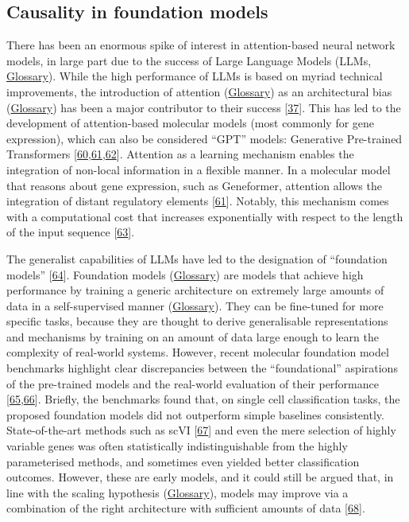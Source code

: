 \hypertarget{causality-in-foundation-models}{%
\subsection{Causality in foundation models}\label{causality-in-foundation-models}}

There has been an enormous spike of interest in attention-based neural network models, in large part due to the success of Large Language Models (LLMs, \protect\hyperlink{large-language-models}{Glossary}).
While the high performance of LLMs is based on myriad technical improvements, the introduction of attention (\protect\hyperlink{attention-deep-learning}{Glossary}) as an architectural bias (\protect\hyperlink{bias-machine-learning}{Glossary}) has been a major contributor to their success {[}\protect\hyperlink{ref-rh7nCPVE}{37}{]}.
This has led to the development of attention-based molecular models (most commonly for gene expression), which can also be considered ``GPT'' models: Generative Pre-trained Transformers {[}\protect\hyperlink{ref-gAQyFCbW}{60},\protect\hyperlink{ref-VmzWBJUJ}{61},\protect\hyperlink{ref-r5y0HbhJ}{62}{]}.
Attention as a learning mechanism enables the integration of non-local information in a flexible manner.
In a molecular model that reasons about gene expression, such as Geneformer, attention allows the integration of distant regulatory elements {[}\protect\hyperlink{ref-VmzWBJUJ}{61}{]}.
Notably, this mechanism comes with a computational cost that increases exponentially with respect to the length of the input sequence {[}\protect\hyperlink{ref-1DSO3BUly}{63}{]}.

The generalist capabilities of LLMs have led to the designation of ``foundation models'' {[}\protect\hyperlink{ref-U6LC2Ufe}{64}{]}.
Foundation models (\protect\hyperlink{foundation-model}{Glossary}) are models that achieve high performance by training a generic architecture on extremely large amounts of data in a self-supervised manner (\protect\hyperlink{self-supervised-learning}{Glossary}).
They can be fine-tuned for more specific tasks, because they are thought to derive generalisable representations and mechanisms by training on an amount of data large enough to learn the complexity of real-world systems.
However, recent molecular foundation model benchmarks highlight clear discrepancies between the ``foundational'' aspirations of the pre-trained models and the real-world evaluation of their performance {[}\protect\hyperlink{ref-WEYqVcYG}{65},\protect\hyperlink{ref-OFczH7ba}{66}{]}.
Briefly, the benchmarks found that, on single cell classification tasks, the proposed foundation models did not outperform simple baselines consistently.
State-of-the-art methods such as scVI {[}\protect\hyperlink{ref-1ELFXHA51}{67}{]} and even the mere selection of highly variable genes was often statistically indistinguishable from the highly parameterised methods, and sometimes even yielded better classification outcomes.
However, these are early models, and it could still be argued that, in line with the scaling hypothesis (\protect\hyperlink{scaling-hypothesis}{Glossary}), models may improve via a combination of the right architecture with sufficient amounts of data {[}\protect\hyperlink{ref-1GGrqZlzU}{68}{]}.


